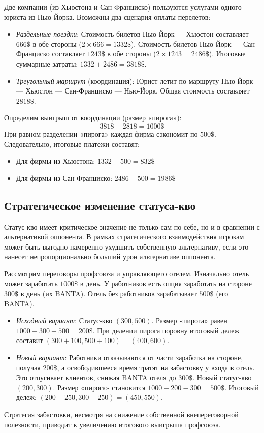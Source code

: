 \begin{example}
Две компании (из Хьюстона и Сан-Франциско) пользуются услугами одного юриста из Нью-Йорка. Возможны два сценария оплаты перелетов:
\begin{itemize}
    \item \textit{Раздельные поездки}: Стоимость билетов Нью-Йорк — Хьюстон составляет $666\$$ в обе стороны ($2 \times 666 = 1332\$$). Стоимость билетов Нью-Йорк — Сан-Франциско составляет $1243\$$ в обе стороны ($2 \times 1243 = 2486\$$). Итоговые суммарные затраты: $1332 + 2486 = 3818\$$.
    \item \textit{Треугольный маршрут} (координация): Юрист летит по маршруту Нью-Йорк — Хьюстон — Сан-Франциско — Нью-Йорк. Общая стоимость составляет $2818\$$.
\end{itemize}

Определим выигрыш от координации (размер «пирога»): 
\[
3818 - 2818 = 1000\$
\]
При равном разделении «пирога» каждая фирма сэкономит по $500\$$. Следовательно, итоговые платежи составят:
\begin{itemize}
    \item Для фирмы из Хьюстона: $1332 - 500 = 832\$$
    \item Для фирмы из Сан-Франциско: $2486 - 500 = 1986\$$
\end{itemize}
\end{example}

\subsection{Стратегическое изменение статуса-кво}

Статус-кво имеет критическое значение не только сам по себе, но и в сравнении с альтернативой оппонента. В рамках стратегического взаимодействия игрокам может быть выгодно намеренно ухудшить собственную альтернативу, если это нанесет непропорционально больший урон альтернативе оппонента.

\begin{example}
Рассмотрим переговоры профсоюза и управляющего отелем. Изначально отель может заработать $1000\$$ в день. У работников есть опция заработать на стороне $300\$$ в день (их BANTA). Отель без работников зарабатывает $500\$$ (его BANTA). 
\begin{itemize}
    \item \textit{Исходный вариант}: Статус-кво $(300, 500)$. Размер «пирога» равен $1000 - 300 - 500 = 200\$$. При делении пирога поровну итоговый дележ составит $(300+100, 500+100) = (400, 600)$.
    \item \textit{Новый вариант}: Работники отказываются от части заработка на стороне, получая $200\$$, а освободившееся время тратят на забастовку у входа в отель. Это отпугивает клиентов, снижая BANTA отеля до $300\$$. Новый статус-кво $(200, 300)$. Размер «пирога» становится $1000 - 200 - 300 = 500\$$. Итоговый дележ: $(200+250, 300+250) = (450, 550)$.
\end{itemize}
Стратегия забастовки, несмотря на снижение собственной внепереговорной полезности, приводит к увеличению итогового выигрыша профсоюза.
\end{example}

